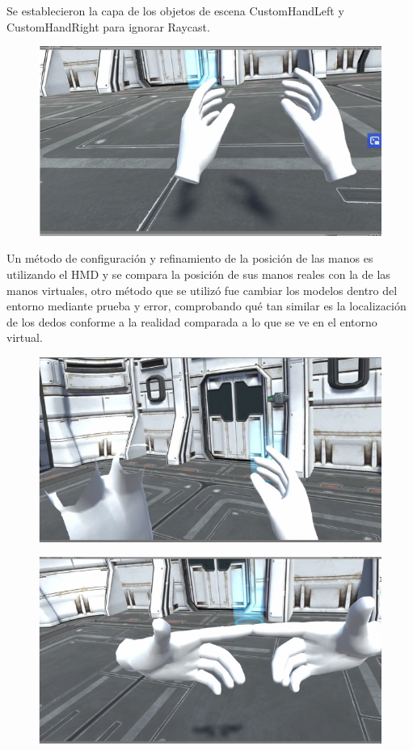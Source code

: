 Se establecieron la capa de los objetos de escena CustomHandLeft y CustomHandRight para ignorar Raycast.\\
\begin{figure}[H]
	\begin{center}
 		\includegraphics[width = .5\textwidth]{source/images/image74.png}
	\end{center} 
\end{figure}
Un método de configuración y refinamiento de la posición de las manos es utilizando el  HMD y se compara la posición de sus manos reales con la de las manos virtuales, otro método que se utilizó fue cambiar los modelos dentro del entorno mediante prueba y error, comprobando qué tan similar es la localización de los dedos conforme a la realidad comparada a lo que se ve en el entorno virtual.\\
\begin{figure}[H]
	\begin{center}
 		\includegraphics[width = .5\textwidth]{source/images/image48.png}
	\end{center} 
\end{figure}
\begin{figure}[H]
	\begin{center}
 		\includegraphics[width = .5\textwidth]{source/images/image23.png}
	\end{center} 
\end{figure}

